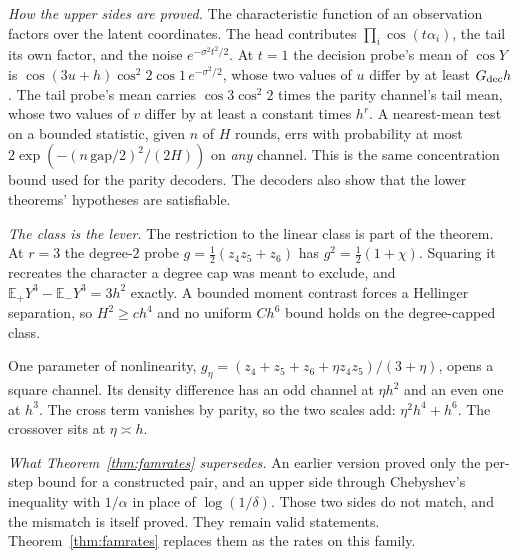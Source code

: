 \emph{How the upper sides are proved.} The characteristic function of an observation factors
over the latent coordinates. The head contributes $\prod_{i}\cos(t\alpha_{i})$, the tail its own
factor, and the noise $e^{-\sigma^{2}t^{2}/2}$. At $t=1$ the decision probe's mean of $\cos Y$ is
$\cos(3u+h)\cos^{2}2\cos1\,e^{-\sigma^{2}/2}$, whose two values of $u$ differ by at least
$G_{\rm dec}h$. The tail probe's mean carries $\cos3\cos^{2}2$ times the parity channel's tail
mean, whose two values of $v$ differ by at least a constant times $h^{r}$. A nearest-mean test on
a bounded statistic, given $n$ of $H$ rounds, errs with probability at most
$2\exp(-(n\,\mathrm{gap}/2)^{2}/(2H))$ on \emph{any} channel. This is the same concentration
bound used for the parity decoders. The decoders
also show that the lower theorems' hypotheses are satisfiable.

\emph{The class is the lever.} The restriction to the linear class is part of the theorem. At
$r=3$ the degree-$2$ probe $g=\frac12(z_{4}z_{5}+z_{6})$ has $g^{2}=\frac12(1+\chi)$. Squaring it
recreates the character a degree cap was meant to exclude, and
$\mathbb{E}_{+}Y^{3}-\mathbb{E}_{-}Y^{3}=3h^{2}$ exactly. \CERT{} A bounded moment contrast forces a
Hellinger separation, so $H^{2}\ge ch^{4}$ and no uniform $Ch^{6}$ bound holds on the
degree-capped class.

 One parameter of nonlinearity,
$g_{\eta}=(z_{4}+z_{5}+z_{6}+\eta z_{4}z_{5})/(3+\eta)$, opens a square channel. Its density
difference has an odd channel at $\eta h^{2}$ and an even one at $h^{3}$. The cross term
vanishes by parity, so the two scales add: $\eta^{2}h^{4}+h^{6}$. The crossover sits at
$\eta\asymp h$.


\emph{What Theorem~\ref{thm:famrates} supersedes.} An earlier version proved only the per-step
bound for a constructed pair, and an upper side through Chebyshev's inequality with $1/\alpha$
in place of $\log(1/\delta)$. Those two sides do not match, and the mismatch is itself proved.
They remain valid statements. Theorem~\ref{thm:famrates} replaces them as the rates on this
family.


